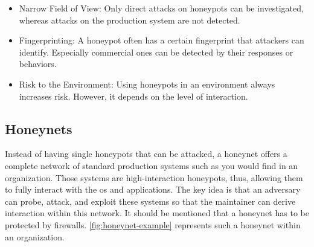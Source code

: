 \begin{itemize}
    \item Narrow Field of View: Only direct attacks on honeypots can be investigated, whereas attacks on the production system are not detected.
    \item Fingerprinting: A honeypot often has a certain fingerprint that attackers can identify.
          Especially commercial ones can be detected by their responses or behaviors.
    \item Risk to the Environment: Using honeypots in an environment always increases risk.
          However, it depends on the level of interaction.
\end{itemize}

\subsection{Honeynets}

Instead of having single honeypots that can be attacked, a honeynet offers a complete network of standard production systems such as you would find in an organization.
Those systems are high-interaction honeypots, thus, allowing them to fully interact with the \ac{os} and applications.
The key idea is that an adversary can probe, attack, and exploit these systems so that the maintainer can derive interaction within this network.
It should be mentioned that a honeynet has to be protected by firewalls.
\autoref{fig:honeynet-example} represents such a honeynet within an organization.

